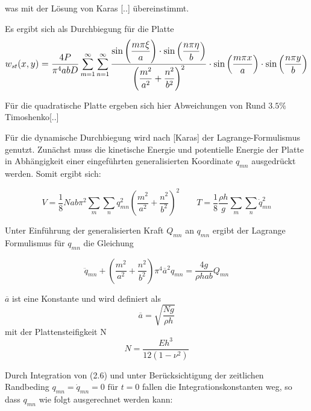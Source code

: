 was mit der Lösung von Karas [..] übereinstimmt.



Es ergibt sich als Durchbiegung für die Platte
\begin{equation}
\mathlarger{
w_{st}(x,y) = \dfrac{4P}{\pi^4 a b D} 
\sum_{m = 1}^{\infty} \sum_{n = 1}^{\infty}
\dfrac{
	\sin\left(\dfrac{m \pi \xi}{a}\right) 
	\cdot \sin\left(\dfrac{n \pi \eta}{b}\right) 
}{
	\left( 
	\dfrac{m^2}{a^2} +
	\dfrac{n^2}{b^2}
	\right)^2
}
\cdot \sin\left(\dfrac{m \pi x}{a}\right) 
\cdot \sin\left(\dfrac{n \pi y}{b}\right) 
}
\end{equation}



Für die quadratische Platte ergeben sich hier Abweichungen von Rund $3.5\%$ Timoshenko[..]



Für die dynamische Durchbiegung wird nach [Karas] der Lagrange-Formulismus genutzt. Zunächst muss die kinetische Energie und potentielle Energie der Platte in Abhängigkeit einer eingeführten generalisierten Koordinate $q_{mn}$ ausgedrückt werden. Somit ergibt sich:

\begin{equation}
V = \dfrac{1}{8}N a b \pi^2 \sum_m \sum_n q_{mn}^2 \left(\frac{m^2}{a^2} + \frac{n^2}{b^2} \right)^2 \qquad T = \dfrac{1}{8 }\dfrac{\rho h}{g }\sum_m \sum_n \dot{q}_{mn}^2
\end{equation}


Unter Einführung der generalisierten Kraft $Q_{mn}$ an $q_{mn}$ ergibt der Lagrange Formulismus für $q_{mn}$ die Gleichung

\begin{equation}
\ddot{q}_{mn} + \left(\frac{m^2}{a^2} + \frac{n^2}{b^2} \right) \pi^4 \overline{a}^2 q_{mn} = \dfrac{4g}{\rho h a b} Q_{mn}
\end{equation}

$\overline{a}$ ist eine Konstante und wird definiert als 
\begin{equation}
\overline{a} = \sqrt{\dfrac{N g}{\rho h}}
\end{equation} 
mit der Plattensteifigkeit N 
\begin{equation}
N = \dfrac{E h^3}{12 (1-\nu^2)}
\end{equation} 





Durch Integration von (2.6) und unter Berücksichtigung der zeitlichen Randbeding $q_{mn} = \dot{q}_{mn} = 0 \text{ für } t = 0$ fallen die Integrationskonstanten weg, so dass $q_{mn}$ wie folgt ausgerechnet werden kann:

